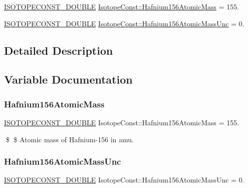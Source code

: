 \begin{DoxyCompactItemize}
\item 
\mbox{\hyperlink{group___isotope_const-_macros_ga8f45a7272ce02c0b4c65c44636ed719a}{I\+S\+O\+T\+O\+P\+E\+C\+O\+N\+S\+T\+\_\+\+D\+O\+U\+B\+LE}} \mbox{\hyperlink{group___isotope_const-_hafnium-_hf156_ga0bda41926eceb288f42edf3d68123686}{Isotope\+Const\+::\+Hafnium156\+Atomic\+Mass}} = 155.
\item 
\mbox{\hyperlink{group___isotope_const-_macros_ga8f45a7272ce02c0b4c65c44636ed719a}{I\+S\+O\+T\+O\+P\+E\+C\+O\+N\+S\+T\+\_\+\+D\+O\+U\+B\+LE}} \mbox{\hyperlink{group___isotope_const-_hafnium-_hf156_ga25fcda0a0e3dfe2ef3828e77acc14f2a}{Isotope\+Const\+::\+Hafnium156\+Atomic\+Mass\+Unc}} = 0.
\end{DoxyCompactItemize}


\subsection{Detailed Description}


\subsection{Variable Documentation}
\mbox{\label{group___isotope_const-_hafnium-_hf156_ga0bda41926eceb288f42edf3d68123686}} 
\subsubsection{\texorpdfstring{Hafnium156\+Atomic\+Mass}{Hafnium156AtomicMass}}
{\footnotesize\ttfamily \mbox{\hyperlink{group___isotope_const-_macros_ga8f45a7272ce02c0b4c65c44636ed719a}{I\+S\+O\+T\+O\+P\+E\+C\+O\+N\+S\+T\+\_\+\+D\+O\+U\+B\+LE}} Isotope\+Const\+::\+Hafnium156\+Atomic\+Mass = 155.}

\$ \$ Atomic mass of Hafnium-\/156 in amu. \mbox{\label{group___isotope_const-_hafnium-_hf156_ga25fcda0a0e3dfe2ef3828e77acc14f2a}} 
\subsubsection{\texorpdfstring{Hafnium156\+Atomic\+Mass\+Unc}{Hafnium156AtomicMassUnc}}
{\footnotesize\ttfamily \mbox{\hyperlink{group___isotope_const-_macros_ga8f45a7272ce02c0b4c65c44636ed719a}{I\+S\+O\+T\+O\+P\+E\+C\+O\+N\+S\+T\+\_\+\+D\+O\+U\+B\+LE}} Isotope\+Const\+::\+Hafnium156\+Atomic\+Mass\+Unc = 0.}


